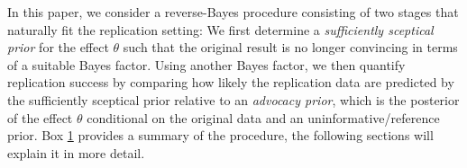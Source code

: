 

In this paper, we consider a reverse-Bayes procedure consisting of two stages
that naturally fit the replication setting: We first determine a
\emph{sufficiently sceptical prior} for the effect $\theta$ such that the
original result is no longer convincing in terms of a suitable Bayes factor.
Using another Bayes factor, we then quantify replication success by comparing
how likely the replication data are predicted by the sufficiently sceptical
prior relative to an \emph{advocacy prior}, which is the posterior of the effect
$\theta$ conditional on the original data and an uninformative/reference prior.
Box \hyperref[box:nutshell]{1} provides a summary of the procedure, the
following sections will explain it in more detail.

